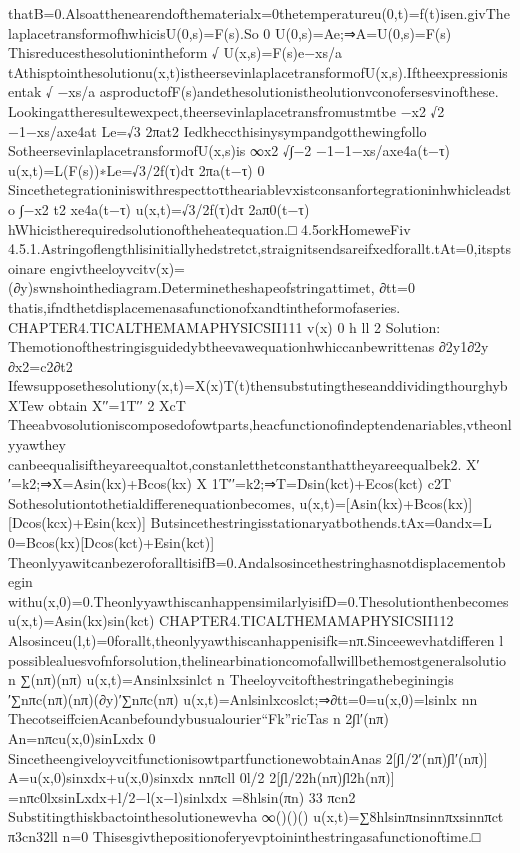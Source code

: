 {{{{thatB=0.Alsoatthenearendofthematerialx=0thetemperatureu(0,t)=f(t)isen.givThe
laplacetransformofhwhicisU(0,s)=F(s).So
0
U(0,s)=Ae;⇒A=U(0,s)=F(s)
Thisreducesthesolutionintheform
√
U(x,s)=F(s)e−xs/a
tAthisptointhesolutionu(x,t)istheersevinlaplacetransformofU(x,s).Iftheexpressionisentak
√
−xs/a
asproductofF(s)andethesolutionistheolutionvconofersesvinofthese.
Lookingattheresultewexpect,theersevinlaplacetransfromustmtbe
{}−x2
√2
−1−xs/axe4at
Le=√3
2πat2
Iedkheccthisinysympandgotthewingfollo
SotheersevinlaplacetransformofU(x,s)is
∞x2
{√}∫−2
−1−1−xs/axe4a(t−τ)
u(x,t)=L(F(s))∗Le=√3/2f(τ)dτ
2πa(t−τ)
0
Sincethetegrationiniswithrespecttoτtheariablevxistconsanfortegrationinhwhicleadsto
∫−x2
t2
xe4a(t−τ)
u(x,t)=√3/2f(τ)dτ
2aπ0(t−τ)
hWhicistherequiredsolutionoftheheatequation.□
4.5orkHomeweFiv
4.5.1.Astringoflengthlisinitiallyhedstretct,straignitsendsareifxedforallt.tAt=0,itsptsoinare
engivtheeloyvcitv(x)=(∂y)swnshointhediagram.Determinetheshapeofstringattimet,
∂tt=0
thatis,ifndthetdisplacemenasafunctionofxandtintheformofaseries.
CHAPTER4.TICALTHEMAMAPHYSICSII111
v(x)
0
h
ll
2
Solution:
Themotionofthestringisguidedybtheevawequationhwhiccanbewrittenas
∂2y1∂2y
∂x2=c2∂t2
Ifewsupposethesolutiony(x,t)=X(x)T(t)thensubstutingtheseanddividingthourghybXTew
obtain
X′′=1T′′
2
XcT
Theeabvosolutioniscomposedofowtparts,heacfunctionofindeptendenariables,vtheonlyyawthey
canbeequalisiftheyareequaltot,constanletthetconstanthattheyareequalbek2.
X′′=k2;⇒X=Asin(kx)+Bcos(kx)
X
1T′′=k2;⇒T=Dsin(kct)+Ecos(kct)
c2T
Sothesolutiontothetialdifferenequationbecomes,
u(x,t)=[Asin(kx)+Bcos(kx)][Dcos(kcx)+Esin(kcx)]
Butsincethestringisstationaryatbothends.tAx=0andx=L
0=Bcos(kx)[Dcos(kct)+Esin(kct)]
TheonlyyawitcanbezeroforalltisifB=0.Andalsosincethestringhasnotdisplacementobegin
withu(x,0)=0.TheonlyyawthiscanhappensimilarlyisifD=0.Thesolutionthenbecomes
u(x,t)=Asin(kx)sin(kct)
CHAPTER4.TICALTHEMAMAPHYSICSII112
Alsosinceu(l,t)=0forallt,theonlyyawthiscanhappenisifk=nπ.Sinceewevhatdifferen
l
possiblealuesvofnforsolution,thelinearbinationcomofallwillbethemostgeneralsolution
∑(nπ)(nπ)
u(x,t)=Ansinlxsinlct
n
Theeloyvcitofthestringathebeginingis
′∑nπc(nπ)(nπ)(∂y)′∑nπc(nπ)
u(x,t)=Anlsinlxcoslct;⇒∂tt=0=u(x,0)=lsinlx
nn
ThecotseiffcienAcanbefoundybusualourier“Fk”ricTas
n
2∫l′(nπ)
An=nπcu(x,0)sinLxdx
0
SincetheengiveloyvcitfunctionisowtpartfunctionewobtainAnas
2[∫l/2′(nπ)∫l′(nπ)]
A=u(x,0)sinxdx+u(x,0)sinxdx
nnπcll
0l/2
2[∫l/22h(nπ)∫l2h(nπ)]
=nπc0lxsinLxdx+l/2−l(x−l)sinlxdx
=8hlsin(πn)
33
πcn2
Substitingthiskbactointhesolutionewevha
∞()()()
u(x,t)=∑8hlsinπnsinnπxsinnπct
π3cn32ll
n=0
Thisesgivthepositionoferyevptoininthestringasafunctionoftime.□
}}}}
